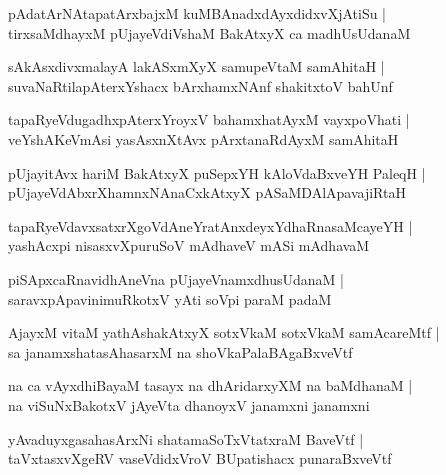 \documentclass[twoside,12pt,openright]{book}
\newcounter{shloka}[chapter]
\begin{document}
\begin{shloka}%
pAdatArNAtapatArxbajxM kuMBAnadxdAyxdidxvXjAtiSu |\\
tirxsaMdhayxM pUjayeVdiVshaM BakAtxyX ca madhUsUdanaM 
\end{shloka}

\begin{shloka}%
sAkAsxdivxmalayA lakASxmXyX samupeVtaM samAhitaH |\\
suvaNaRtilapAterxYshacx bArxhamxNAnf shakitxtoV bahUnf 
\end{shloka}

\begin{shloka}%
tapaRyeVdugadhxpAterxYroyxV bahamxhatAyxM vayxpoVhati |\\
veYshAKeVmAsi yasAsxnXtAvx pArxtanaRdAyxM samAhitaH 
\end{shloka}

\begin{shloka}%
pUjayitAvx hariM BakAtxyX puSepxYH kAloVdaBxveYH PaleqH |\\
pUjayeVdAbxrXhamnxNAnaCxkAtxyX pASaMDAlApavajiRtaH 
\end{shloka}

\begin{shloka}%
tapaRyeVdavxsatxrXgoVdAneYratAnxdeyxYdhaRnasaMcayeYH |\\
yashAcxpi nisasxvXpuruSoV mAdhaveV mASi mAdhavaM 
\end{shloka}

\begin{shloka}%
piSApxcaRnavidhAneVna pUjayeVnamxdhusUdanaM |\\
saravxpApavinimuRkotxV yAti soVpi paraM padaM 
\end{shloka}

\begin{shloka}%
AjayxM vitaM yathAshakAtxyX sotxVkaM sotxVkaM samAcareMtf |\\
sa janamxshatasAhasarxM na shoVkaPalaBAgaBxveVtf
\end{shloka}

\begin{shloka}%
na ca vAyxdhiBayaM tasayx na dhAridarxyXM na baMdhanaM |\\
na viSuNxBakotxV jAyeVta dhanoyxV janamxni janamxni 
\end{shloka}

\begin{shloka}%
yAvaduyxgasahasArxNi shatamaSoTxVtatxraM BaveVtf |\\
taVxtasxvXgeRV vaseVdidxVroV BUpatishacx punaraBxveVtf
\end{shloka}
\end{document}
